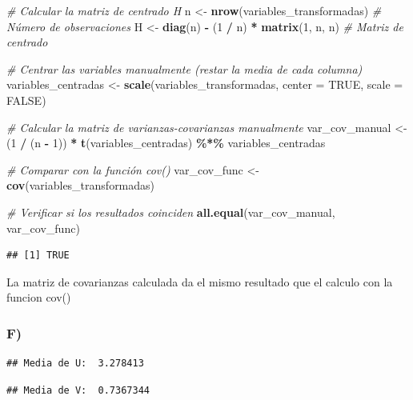 \documentclass[
]{article}
\newenvironment{Shaded}{\begin{snugshade}}{\end{snugshade}}
\newcommand{\AttributeTok}[1]{\textcolor[rgb]{0.13,0.29,0.53}{#1}}
\newcommand{\CommentTok}[1]{\textcolor[rgb]{0.56,0.35,0.01}{\textit{#1}}}
\newcommand{\ConstantTok}[1]{\textcolor[rgb]{0.56,0.35,0.01}{#1}}
\newcommand{\DecValTok}[1]{\textcolor[rgb]{0.00,0.00,0.81}{#1}}
\newcommand{\FunctionTok}[1]{\textcolor[rgb]{0.13,0.29,0.53}{\textbf{#1}}}
\newcommand{\NormalTok}[1]{#1}
\newcommand{\OtherTok}[1]{\textcolor[rgb]{0.56,0.35,0.01}{#1}}
\newcommand{\SpecialCharTok}[1]{\textcolor[rgb]{0.81,0.36,0.00}{\textbf{#1}}}
\begin{document}
\begin{Shaded}
\begin{Highlighting}[]
\CommentTok{\# Calcular la matriz de centrado H}
\NormalTok{n }\OtherTok{\textless{}{-}} \FunctionTok{nrow}\NormalTok{(variables\_transformadas)  }\CommentTok{\# Número de observaciones}
\NormalTok{H }\OtherTok{\textless{}{-}} \FunctionTok{diag}\NormalTok{(n) }\SpecialCharTok{{-}}\NormalTok{ (}\DecValTok{1} \SpecialCharTok{/}\NormalTok{ n) }\SpecialCharTok{*} \FunctionTok{matrix}\NormalTok{(}\DecValTok{1}\NormalTok{, n, n)  }\CommentTok{\# Matriz de centrado}

\CommentTok{\# Centrar las variables manualmente (restar la media de cada columna)}
\NormalTok{variables\_centradas }\OtherTok{\textless{}{-}} \FunctionTok{scale}\NormalTok{(variables\_transformadas, }\AttributeTok{center =} \ConstantTok{TRUE}\NormalTok{, }\AttributeTok{scale =} \ConstantTok{FALSE}\NormalTok{)}

\CommentTok{\# Calcular la matriz de varianzas{-}covarianzas manualmente}
\NormalTok{var\_cov\_manual }\OtherTok{\textless{}{-}}\NormalTok{ (}\DecValTok{1} \SpecialCharTok{/}\NormalTok{ (n }\SpecialCharTok{{-}} \DecValTok{1}\NormalTok{)) }\SpecialCharTok{*} \FunctionTok{t}\NormalTok{(variables\_centradas) }\SpecialCharTok{\%*\%}\NormalTok{ variables\_centradas}

\CommentTok{\# Comparar con la función cov()}
\NormalTok{var\_cov\_func }\OtherTok{\textless{}{-}} \FunctionTok{cov}\NormalTok{(variables\_transformadas)}

\CommentTok{\# Verificar si los resultados coinciden}
\FunctionTok{all.equal}\NormalTok{(var\_cov\_manual, var\_cov\_func)}
\end{Highlighting}
\end{Shaded}

\begin{verbatim}
## [1] TRUE
\end{verbatim}

La matriz de covarianzas calculada da el mismo resultado que el calculo
con la funcion cov()

\hypertarget{f}{%
\subsubsection{F)}\label{f}}

\begin{verbatim}
## Media de U:  3.278413
\end{verbatim}

\begin{verbatim}
## Media de V:  0.7367344
\end{verbatim}
\end{document}
